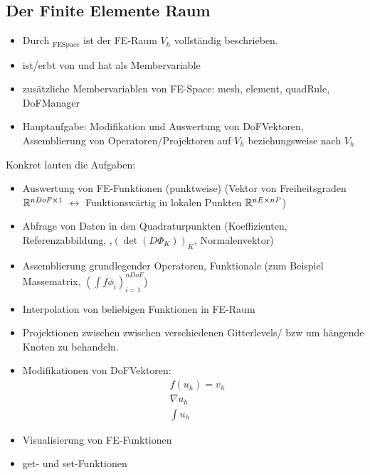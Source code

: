 \subsection{Der Finite Elemente Raum  }

\begin{itemize}
\item Durch 
$_{\text{FESpace}}$
 ist der FE-Raum $V_h$ vollständig beschrieben.
\item {} ist/erbt von  und hat  als Membervariable
\item zusätzliche Membervariablen von FE-Space: mesh, element, quadRule, DoFManager
\item Hauptaufgabe: Modifikation und Auswertung von DoFVektoren, Assemblierung von Operatoren/Projektoren auf $V_h$ beziehungsweise nach $V_h$
\end{itemize}
Konkret lauten die Aufgaben:
\begin{itemize}
\item Auswertung von FE-Funktionen (punktweise)
(Vektor von Freiheitsgraden $\mathbb{R}^{nDoF \times 1}$ $\leftrightarrow$ Funktionswärtig in lokalen Punkten $\mathbb{R}^{nE \times nP}$)
\item Abfrage von Daten in den Quadraturpunkten (Koeffizienten, Referenzabbildung, ,$(\det(D \Phi_K))_K$, Normalenvektor)
\item Assemblierung grundlegender Operatoren, Funktionale (zum Beispiel Massematrix, $(\int f \phi_i)_{i = 1}^{nDoF}$)
\item Interpolation von beliebigen Funktionen in FE-Raum
\item Projektionen zwischen zwischen verschiedenen Gitterlevels/ bzw um hängende Knoten zu behandeln. 
\item Modifikationen von DoFVektoren:
\begin{align*}
&  f(u_h) = v_h\\
& \nabla u_h \\
& \int u_h
\end{align*}
\item Visualisierung von FE-Funktionen
\item get- und set-Funktionen
\end{itemize}

